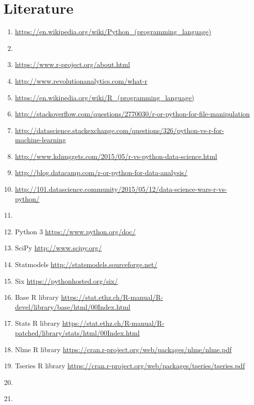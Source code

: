 \documentclass{article}
\begin{document}
\newpage
\section{Literature}
\begin{enumerate}
    \item \url{https://en.wikipedia.org/wiki/Python_(programming_language)}
    \item
    \item \url{https://www.r-project.org/about.html}
    \item \url{http://www.revolutionanalytics.com/what-r}
    \item \url{https://en.wikipedia.org/wiki/R_(programming_language)}
    \item \url{http://stackoverflow.com/questions/2770030/r-or-python-for-file-manipulation}
    \item \url{http://datascience.stackexchange.com/questions/326/python-vs-r-for-machine-learning}
    \item \url{http://www.kdnuggets.com/2015/05/r-vs-python-data-science.html}
    \item \url{http://blog.datacamp.com/r-or-python-for-data-analysis/}
    \item \url{http://101.datascience.community/2015/05/12/data-science-wars-r-vs-python/}
    \item
    \item Python 3 \url{https://www.python.org/doc/}
    \item SciPy \url{http://www.scipy.org/}
    \item Statmodels \url{http://statsmodels.sourceforge.net/}
    \item Six \url{https://pythonhosted.org/six/}
    \item Base R library \url{https://stat.ethz.ch/R-manual/R-devel/library/base/html/00Index.html}
    \item Stats R library \url{https://stat.ethz.ch/R-manual/R-patched/library/stats/html/00Index.html}
    \item Nlme R library \url{https://cran.r-project.org/web/packages/nlme/nlme.pdf}
    \item Tseries R library \url{https://cran.r-project.org/web/packages/tseries/tseries.pdf}
    \item \url{}
    \item \url{}
\end{enumerate}
\end{document}
